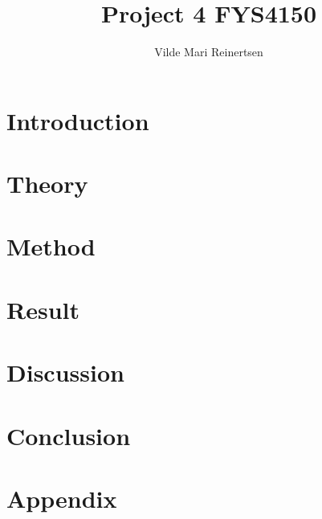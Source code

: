 

\title{Project 4 FYS4150}
\author{Vilde Mari Reinertsen}
\raggedbottom



\maketitle

\begin{abstract}







  
\tableofcontents
\end{abstract}

\twocolumn

\section{Introduction}


\section{Theory}


\section{Method}


\section{Result}


\section{Discussion}


\section{Conclusion}


\newpage



\section*{Appendix}




